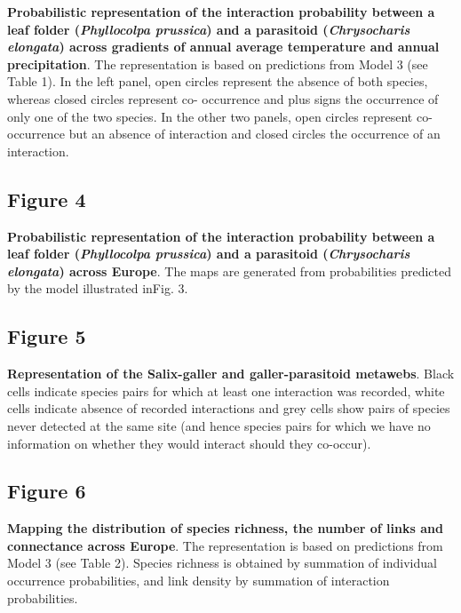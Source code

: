 \documentclass[12pt]{article}
\begin{document}
\textbf{Probabilistic representation of the interaction probability between a
leaf folder (\textit{Phyllocolpa prussica}) and a parasitoid
(\textit{Chrysocharis elongata}) across gradients of annual average
temperature and annual precipitation}. The representation is based on
predictions from Model 3 (see Table 1). In the left panel, open circles
represent the absence of both species, whereas closed circles represent co-
occurrence and plus signs the occurrence of only one of the two species. In
the other two panels, open circles represent co-occurrence but an absence of
interaction and closed circles the occurrence of an interaction.

\subsection*{Figure 4}

\textbf{Probabilistic representation of the interaction probability between a
leaf folder (\textit{Phyllocolpa prussica}) and a parasitoid
(\textit{Chrysocharis elongata}) across Europe}. The maps are generated from 
probabilities predicted by the model illustrated inFig. 3.

\subsection*{Figure 5}

\textbf{Representation of the Salix-galler and galler-parasitoid metawebs}.
Black cells indicate species pairs for which at least one interaction was
recorded, white cells indicate absence of recorded interactions and grey
cells show pairs of species never detected at the same site (and hence species
pairs for which we have no information on whether they would interact should
they co-occur).

\subsection*{Figure 6}

\textbf{Mapping the distribution of species richness, the number of links and
connectance across Europe}. The representation is based on predictions from
Model 3 (see Table 2). Species richness is obtained by summation of individual 
occurrence probabilities, and link density by summation of interaction probabilities.

\newpage

\end{document}

